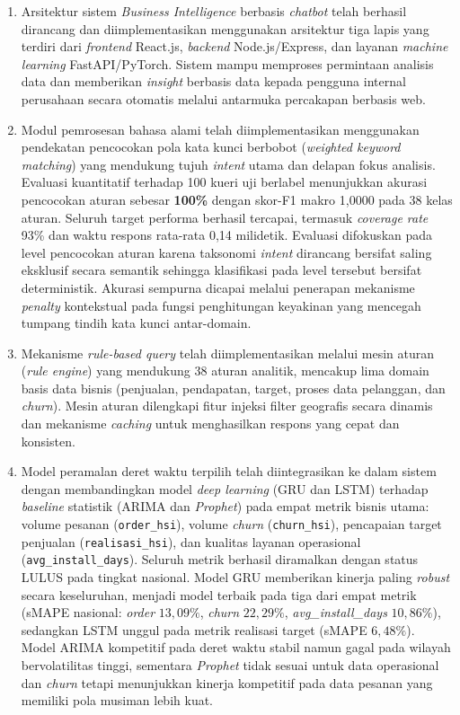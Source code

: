 \begin{enumerate}
  \item Arsitektur sistem \textit{Business Intelligence} berbasis \textit{chatbot} telah berhasil dirancang dan diimplementasikan menggunakan arsitektur tiga lapis yang terdiri dari \textit{frontend} React.js, \textit{backend} Node.js/Express, dan layanan \textit{machine learning} FastAPI/PyTorch. Sistem mampu memproses permintaan analisis data dan memberikan \textit{insight} berbasis data kepada pengguna internal perusahaan secara otomatis melalui antarmuka percakapan berbasis web.

  \item Modul pemrosesan bahasa alami telah diimplementasikan menggunakan pendekatan pencocokan pola kata kunci berbobot (\textit{weighted keyword matching}) yang mendukung tujuh \textit{intent} utama dan delapan fokus analisis. Evaluasi kuantitatif terhadap 100 kueri uji berlabel menunjukkan akurasi pencocokan aturan sebesar \textbf{100\%} dengan skor-F1 makro 1{,}0000 pada 38 kelas aturan. Seluruh target performa berhasil tercapai, termasuk \textit{coverage rate} 93\% dan waktu respons rata-rata 0{,}14 milidetik. Evaluasi difokuskan pada level pencocokan aturan karena taksonomi \textit{intent} dirancang bersifat saling eksklusif secara semantik sehingga klasifikasi pada level tersebut bersifat deterministik. Akurasi sempurna dicapai melalui penerapan mekanisme \textit{penalty} kontekstual pada fungsi penghitungan keyakinan yang mencegah tumpang tindih kata kunci antar-domain.

  \item Mekanisme \textit{rule-based query} telah diimplementasikan melalui mesin aturan (\textit{rule engine}) yang mendukung 38 aturan analitik, mencakup lima domain basis data bisnis (penjualan, pendapatan, target, proses data pelanggan, dan \textit{churn}). Mesin aturan dilengkapi fitur injeksi filter geografis secara dinamis dan mekanisme \textit{caching} untuk menghasilkan respons yang cepat dan konsisten.

  \item Model peramalan deret waktu terpilih telah diintegrasikan ke dalam sistem dengan membandingkan model \textit{deep learning} (GRU dan LSTM) terhadap \textit{baseline} statistik (ARIMA dan \textit{Prophet}) pada empat metrik bisnis utama: volume pesanan (\texttt{or\-der\-\_hsi}), volume \textit{churn} (\texttt{churn\-\_hsi}), pencapaian target penjualan (\texttt{re\-a\-li\-sa\-si\-\_hsi}), dan kualitas layanan operasional (\texttt{avg\-\_in\-stall\-\_days}). Seluruh metrik berhasil diramalkan dengan status LULUS pada tingkat nasional. Model GRU memberikan kinerja paling \textit{robust} secara keseluruhan, menjadi model terbaik pada tiga dari empat metrik (sMAPE nasional: \textit{order} $13{,}09\%$, \textit{churn} $22{,}29\%$, \textit{avg\_install\_days} $10{,}86\%$), sedangkan LSTM unggul pada metrik realisasi target (sMAPE $6{,}48\%$). Model ARIMA kompetitif pada deret waktu stabil namun gagal pada wilayah bervolatilitas tinggi, sementara \textit{Prophet} tidak sesuai untuk data operasional dan \textit{churn} tetapi menunjukkan kinerja kompetitif pada data pesanan yang memiliki pola musiman lebih kuat.


\end{enumerate}
